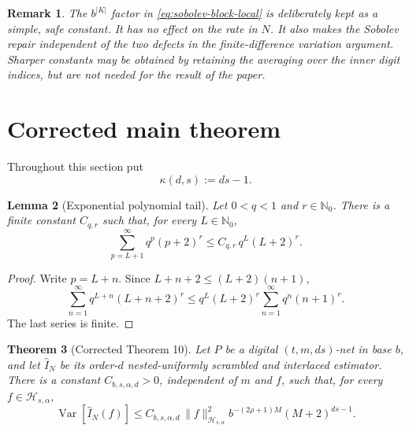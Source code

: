 \documentclass[11pt]{article}
\newtheorem{theorem}{Theorem}[section]
\newtheorem{lemma}[theorem]{Lemma}
\newtheorem{remark}[theorem]{Remark}
\newcommand{\Nzero}{\mathbb N_0}
\newcommand{\Var}{\operatorname{Var}}
\newcommand{\abs}[1]{\lvert #1\rvert}
\newcommand{\norm}[1]{\lVert #1\rVert}
\begin{document}
\begin{remark}
The $b^{\abs K}$ factor in \eqref{eq:sobolev-block-local} is deliberately kept
as a simple, safe constant.  It has no effect on the rate in $N$.  It also makes the Sobolev repair independent of the two defects in the
finite-difference variation argument.
Sharper constants may be obtained by retaining the averaging over the inner
digit indices, but are not needed for the result of the paper.
\end{remark}

\section{Corrected main theorem}

Throughout this section put
\begin{equation}\label{eq:kappa}
 \kappa(d,s):=ds-1.
\end{equation}

\begin{lemma}[Exponential polynomial tail]\label{lem:tail}
Let $0<q<1$ and $r\in\Nzero$.  There is a finite constant $C_{q,r}$ such that,
for every $L\in\Nzero$,
\[
 \sum_{p=L+1}^{\infty}q^p(p+2)^r
 \le C_{q,r}\,q^L(L+2)^r.
\]
\end{lemma}

\begin{proof}
Write $p=L+n$.  Since $L+n+2\le(L+2)(n+1)$,
\[
 \sum_{n=1}^{\infty}q^{L+n}(L+n+2)^r
 \le q^L(L+2)^r\sum_{n=1}^{\infty}q^n(n+1)^r.
\]
The last series is finite.
\end{proof}

\begin{theorem}[Corrected Theorem 10]\label{thm:main}
Let $P$ be a digital $(t,m,ds)$-net in base $b$, and let
$\widehat I_N$ be its order-$d$ nested-uniformly scrambled and interlaced
estimator.  There is a constant $C_{b,s,\alpha,d}>0$, independent of $m$ and
$f$, such that, for every $f\in\mathcal H_{s,\alpha}$,
\begin{equation}\label{eq:main-sobolev}
 \Var[\widehat I_N(f)]
 \le C_{b,s,\alpha,d}\,\norm f_{\mathcal H_{s,\alpha}}^2
 b^{-(2\rho+1)M}(M+2)^{ds-1}.
\end{equation}
\end{theorem}
\end{document}
